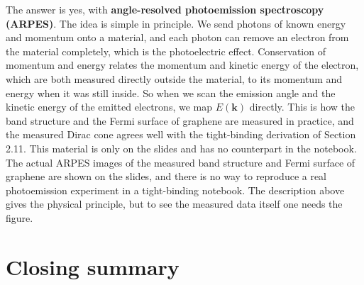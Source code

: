 The answer is yes, with \textbf{angle-resolved photoemission spectroscopy (ARPES)}. The idea is
simple in principle. We send photons of known energy and momentum onto a material, and each photon
can remove an electron from the material completely, which is the photoelectric effect. Conservation
of momentum and energy relates the momentum and kinetic energy of the electron, which are both
measured directly outside the material, to its momentum and energy when it was still inside. So when
we scan the emission angle and the kinetic energy of the emitted electrons, we map $E(\mathbf{k})$
directly. This is how the band structure and the Fermi surface of graphene are measured in practice,
and the measured Dirac cone agrees well with the tight-binding derivation of Section 2.11. This
material is only on the slides and has no counterpart in the notebook. The actual ARPES images of the
measured band structure and Fermi surface of graphene are shown on the slides, and there is no way to
reproduce a real photoemission experiment in a tight-binding notebook. The description above gives the
physical principle, but to see the measured data itself one needs the figure.

\section{Closing summary}

